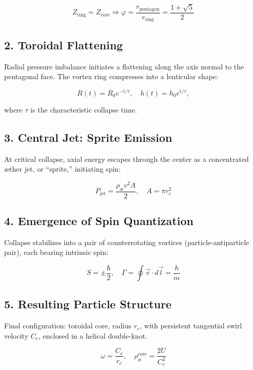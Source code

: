 \documentclass[11pt]{article}
\begin{document}
\begin{equation}
    Z_\text{ring} = Z_\text{core} \Rightarrow \varphi = \frac{r_\text{pentagon}}{r_\text{ring}} = \frac{1+\sqrt{5}}{2}
\end{equation}

\subsection*{2. Toroidal Flattening}
Radial pressure imbalance initiates a flattening along the axis normal to the pentagonal face. The vortex ring compresses into a lenticular shape:

\begin{equation}
    R(t) = R_0 e^{-t/\tau}, \quad h(t) = h_0 e^{t/\tau},
\end{equation}

where $\tau$ is the characteristic collapse time.

\subsection*{3. Central Jet: Sprite Emission}
At critical collapse, axial energy escapes through the center as a concentrated æther jet, or ``sprite,'' initiating spin:

\begin{equation}
    P_\text{jet} = \frac{\rho_\text{\ae} v^2 A}{2}, \quad A = \pi r_c^2
\end{equation}

\subsection*{4. Emergence of Spin Quantization}
Collapse stabilizes into a pair of counterrotating vortices (particle-antiparticle pair), each bearing intrinsic spin:

\begin{equation}
    S = \pm \frac{\hbar}{2}, \quad \Gamma = \oint \vec{v} \cdot d\vec{l} = \frac{h}{m}
\end{equation}

\subsection*{5. Resulting Particle Structure}
Final configuration: toroidal core, radius $r_c$, with persistent tangential swirl velocity $C_e$, enclosed in a helical double-knot.

\begin{equation}
    \omega = \frac{C_e}{r_c}, \quad \rho_\text{\ae}^{\text{core}} = \frac{2 U}{C_e^2}
\end{equation}
\end{document}

